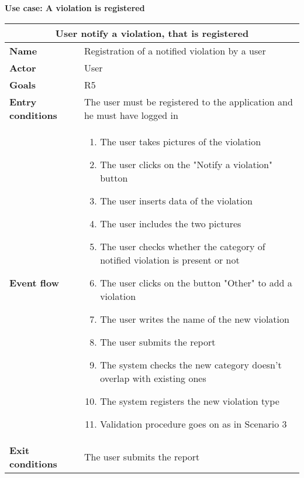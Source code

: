 \begin{description}
    \item \textbf{Use case: A violation is registered}
    \begin{center}
        \begin{tabular}{|p{3cm}|p{7cm}|}
            \multicolumn{2}{c}{\textbf{User notify a violation, that is registered}} \\
            \hline
            \textbf{Name} & Registration of a notified violation by a user \\
            \hline
            \textbf{Actor} & User \\
            \hline
            \textbf{Goals} & R5 \\
            \hline
            \textbf{Entry conditions} & The user must be registered to the application and he must have logged in \\
            \hline
            \textbf{Event flow} &
            \begin{enumerate}
                 \item The user takes pictures of the violation
                \item The user clicks on the "Notify a violation" button
                \item The user inserts data of the violation
                \item The user includes the two pictures 
                \item The user checks whether the category of notified violation is present or not
                \item The user clicks on the button "Other" to add a violation 
                \item The user writes the name of the new violation 
                \item The user submits the report
                \item The system checks the new category doesn't overlap with existing ones 
                \item The system registers the new violation type
                \item Validation procedure goes on as in Scenario 3
            \end{enumerate} \\
            \hline
            \textbf{Exit conditions} & The user submits the report \\
            \hline
        \end{tabular}
    \end{center}
\end{description}

